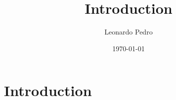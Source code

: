 \documentclass[11pt]{article}
\title{Introduction}
\author{Leonardo Pedro}
\date{\today}
\begin{document}
\tableofcontents
\newpage
\section{Introduction}
\label{intro}

\cite{mehlerUeberEntwicklungFunction1866}

{}

\end{document}
